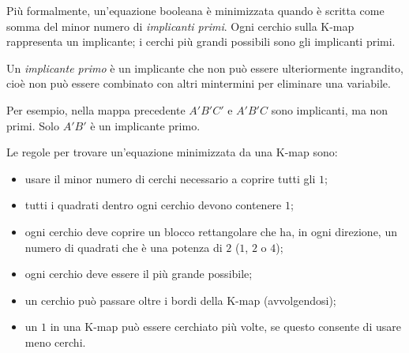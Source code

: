 \documentclass[11pt,a4paper]{article}
\begin{document}
Più formalmente, un'equazione booleana è minimizzata quando è scritta come somma del minor numero di \emph{implicanti primi}. Ogni cerchio sulla K-map rappresenta un implicante; i cerchi più grandi possibili sono gli implicanti primi.

\begin{definizione}
Un \emph{implicante primo} è un implicante che non può essere ulteriormente ingrandito, cioè non può essere combinato con altri mintermini per eliminare una variabile.
\end{definizione}

Per esempio, nella mappa precedente $A'B'C'$ e $A'B'C$ sono implicanti, ma non primi. Solo $A'B'$ è un implicante primo.

Le regole per trovare un'equazione minimizzata da una K-map sono:
\begin{itemize}
    \item usare il minor numero di cerchi necessario a coprire tutti gli $1$;
    \item tutti i quadrati dentro ogni cerchio devono contenere $1$;
    \item ogni cerchio deve coprire un blocco rettangolare che ha, in ogni direzione, un numero di quadrati che è una potenza di $2$ ($1$, $2$ o $4$);
    \item ogni cerchio deve essere il più grande possibile;
    \item un cerchio può passare oltre i bordi della K-map (avvolgendosi);
    \item un $1$ in una K-map può essere cerchiato più volte, se questo consente di usare meno cerchi.
\end{itemize}
\end{document}
